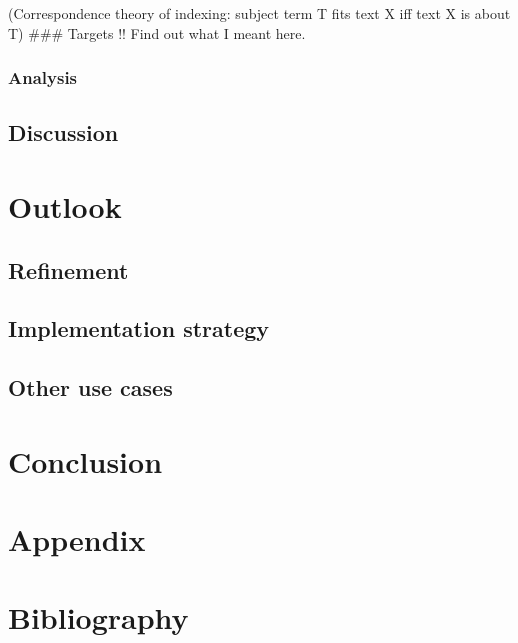 (Correspondence theory of indexing: subject term T fits text X iff text
X is about T) \#\#\# Targets !! Find out what I meant here.

\hypertarget{analysis-2}{%
\subsubsection{Analysis}\label{analysis-2}}

\hypertarget{discussion}{%
\subsection{Discussion}\label{discussion}}

\hypertarget{outlook}{%
\section{Outlook}\label{outlook}}

\hypertarget{refinement}{%
\subsection{Refinement}\label{refinement}}

\hypertarget{implementation-strategy}{%
\subsection{Implementation strategy}\label{implementation-strategy}}

\hypertarget{other-use-cases}{%
\subsection{Other use cases}\label{other-use-cases}}

\hypertarget{conclusion}{%
\section{Conclusion}\label{conclusion}}

\hypertarget{appendix}{%
\section{Appendix}\label{appendix}}

\hypertarget{bibliography}{%
\section{Bibliography}\label{bibliography}}

